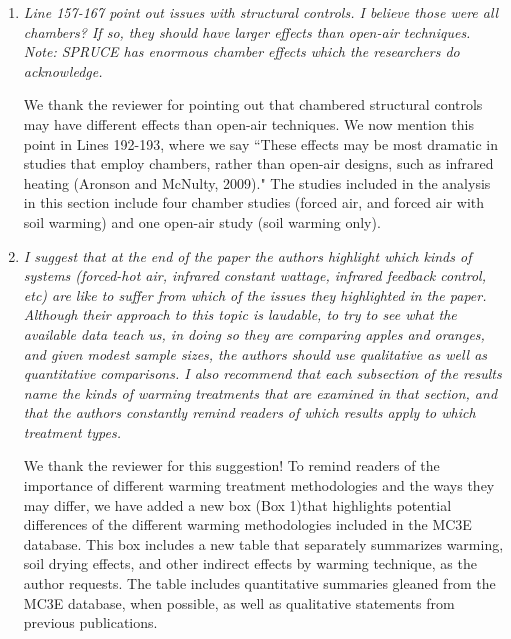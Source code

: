 \documentclass[11pt,a4paper]{letter}
\begin{document}
\begin{letter}{}
\begin{enumerate}
\begin{enumerate}
\item  \emph{Line 157-167 point out issues with structural controls. I believe those were all
chambers? If so, they should have larger effects than open-air techniques.
Note: SPRUCE has enormous chamber effects which the researchers do
acknowledge.}
\par We thank the reviewer for pointing out that chambered structural controls may have different effects than open-air techniques. We now mention this point in Lines 192-193, where we say ``These effects may be most dramatic in studies that employ chambers, rather than open-air designs, such as infrared heating (Aronson and McNulty, 2009)." The studies included in the analysis in this section include four chamber studies (forced air, and forced air with soil warming) and one open-air study (soil warming only). 

\item \emph{ I suggest that at the end of the paper the authors highlight which kinds
of systems (forced-hot air, infrared constant wattage, infrared feedback
control, etc) are like to suffer from which of the issues they highlighted in
the paper. Although their approach to this topic is laudable, to try to
see what the available data teach us, in doing so they are comparing
apples and oranges, and given modest sample sizes, the authors
should use qualitative as well as quantitative comparisons. I also
recommend that each subsection of the results name the kinds of
warming treatments that are examined in that section, and that the
authors constantly remind readers of which results apply to which
treatment types.}
\par We thank the reviewer for this suggestion! To remind readers of the importance of different warming treatment methodologies and the ways they may differ, we have added a new box (Box 1)that highlights potential differences of the different warming methodologies included in the MC3E database. This box includes a new table that separately summarizes warming, soil drying effects, and other indirect effects by warming technique, as the author requests. The table includes quantitative summaries gleaned from the MC3E database, when possible, as well as qualitative statements from previous publications.


\end{enumerate}
\end{enumerate}
\end{letter}
\end{document}
